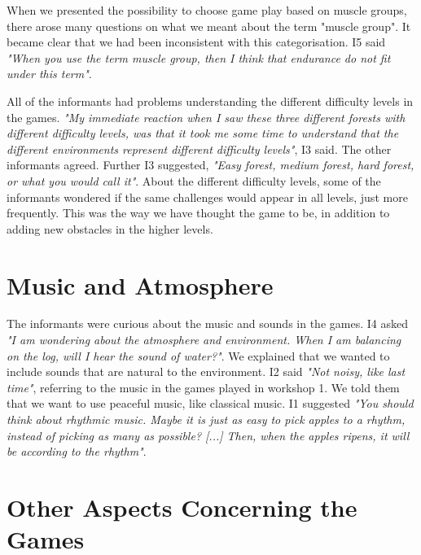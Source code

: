 When we presented the possibility to choose game play based on muscle groups, there arose many questions on what we meant about the term "muscle group". It became clear that we had been inconsistent with this categorisation. I5 said \emph{"When you use the term muscle group, then I think that endurance do not fit under this term"}.   

All of the informants had problems understanding the different difficulty levels in the games. \emph{"My immediate reaction when I saw these three different forests with different difficulty levels, was that it took me some time to understand that the different environments represent different difficulty levels"}, I3 said. The other informants agreed. Further I3 suggested, \emph{"Easy forest, medium forest, hard forest, or what you would call it"}. About the different difficulty levels, some of the informants wondered if the same challenges would appear in all levels, just more frequently. This was the way we have thought the game to be, in addition to adding new obstacles in the higher levels.

\section{Music and Atmosphere}

The informants were curious about the music and sounds in the games. I4 asked \emph{"I am wondering about the atmosphere and environment. When I am balancing on the log, will I hear the sound of water?"}. We explained that we wanted to include sounds that are natural to the environment. I2 said \emph{"Not noisy, like last time"}, referring to the music in the games played in workshop 1. We told them that we want to use peaceful music, like classical music. I1 suggested \emph{"You should think about rhythmic music. Maybe it is just as easy to pick apples to a rhythm, instead of picking as many as possible? [...] Then, when the apples ripens, it will be according to the rhythm"}. 




\section{Other Aspects Concerning the Games}

